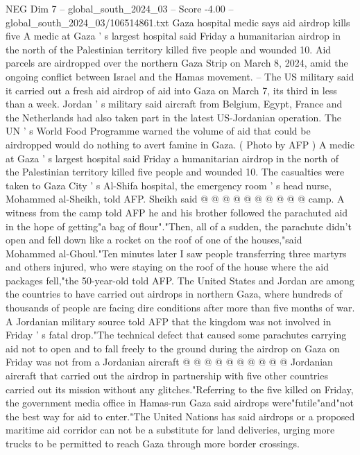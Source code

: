 \begin{textsample}{NEG Dim 7 – global\_south\_2024\_03 – Score -4.00 – global\_south\_2024\_03/106514861.txt}  \label{ex:f7_neg_428}
Gaza hospital medic says aid airdrop kills five A medic at Gaza ' s largest hospital said Friday a humanitarian airdrop in the north of the Palestinian territory killed five people and wounded 10.
Aid parcels are airdropped over the northern Gaza Strip on March 8, 2024, amid the ongoing conflict between Israel and the Hamas movement. -- The US military said it carried out a fresh aid airdrop of aid into Gaza on March 7, its third in less than a week.
Jordan ' s military said aircraft from Belgium, Egypt, France and the Netherlands had also taken part in the latest US-Jordanian operation.
The UN ' s World Food Programme warned the volume of aid that could be airdropped would do nothing to avert famine in Gaza. ( Photo by AFP ) A medic at Gaza ' s largest hospital said Friday a humanitarian airdrop in the north of the Palestinian territory killed five people and wounded 10.
The casualties were taken to Gaza City ' s Al-Shifa hospital, the emergency room ' s head nurse, Mohammed al-Sheikh, told AFP.
Sheikh said @ @ @ @ @ @ @ @ @ @ camp.
A witness from the camp told AFP he and his brother followed the parachuted aid in the hope of getting"a bag of flour"."Then, all of a sudden, the parachute didn't open and fell down like a rocket on the roof of one of the houses,"said Mohammed al-Ghoul."Ten minutes later I saw people transferring three martyrs and others injured, who were staying on the roof of the house where the aid packages fell,"the 50-year-old told AFP.
The United States and Jordan are among the countries to have carried out airdrops in northern Gaza, where hundreds of thousands of people are facing dire conditions after more than five months of war.
A Jordanian military source told AFP that the kingdom was not involved in Friday ' s fatal drop."The technical defect that caused some parachutes carrying aid not to open and to fall freely to the ground during the airdrop on Gaza on Friday was not from a Jordanian aircraft @ @ @ @ @ @ @ @ @ @ Jordanian aircraft that carried out the airdrop in partnership with five other countries carried out its mission without any glitches."Referring to the five killed on Friday, the government media office in Hamas-run Gaza said airdrops were"futile"and"not the best way for aid to enter."The United Nations has said airdrops or a proposed maritime aid corridor can not be a substitute for land deliveries, urging more trucks to be permitted to reach Gaza through more border crossings.

\end{textsample}
